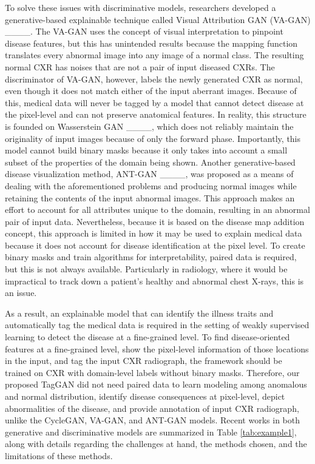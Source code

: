 {To solve these issues with discriminative models, researchers developed a generative-based explainable technique called Visual Attribution GAN (VA-GAN) ____. The VA-GAN uses the concept of visual interpretation to pinpoint disease features, but this has unintended results because the mapping function translates every abnormal image into any image of a normal class. The resulting normal CXR has noises that are not a pair of input diseased CXRs. The discriminator of VA-GAN, however, labels the newly generated CXR as normal, even though it does not match either of the input aberrant images. Because of this, medical data will never be tagged by a model that cannot detect disease at the pixel-level and can not preserve anatomical features. In reality, this structure is founded on Wasserstein GAN ____, which does not reliably maintain the originality of input images because of only the forward phase. Importantly, this model cannot build binary masks because it only takes into account a small subset of the properties of the domain being shown. Another generative-based disease visualization method, ANT-GAN ____, was proposed as a means of dealing with the aforementioned problems and producing normal images while retaining the contents of the input abnormal images. This approach makes an effort to account for all attributes unique to the domain, resulting in an abnormal pair of input data. Nevertheless, because it is based on the disease map addition concept, this approach is limited in how it may be used to explain medical data because it does not account for disease identification at the pixel level. To create binary masks and train algorithms for interpretability, paired data is required, but this is not always available. Particularly in radiology, where it would be impractical to track down a patient's healthy and abnormal chest X-rays, this is an issue. 

As a result, an explainable model that can identify the illness traits and automatically tag the medical data is required in the setting of weakly supervised learning to detect the disease at a fine-grained level. To find disease-oriented features at a fine-grained level, show the pixel-level information of those locations in the input, and tag the input CXR radiograph, the framework should be trained on CXR with domain-level labels without binary masks. Therefore, our proposed TagGAN did not need paired data to learn modeling among anomalous and normal distribution, identify disease consequences at pixel-level, depict abnormalities of the disease, and provide annotation of input CXR radiograph, unlike the CycleGAN, VA-GAN, and ANT-GAN models. Recent works in both generative and discriminative models are summarized in Table \ref{tab:example1}, along with details regarding the challenges at hand, the methods chosen, and the limitations of these methods.

}
